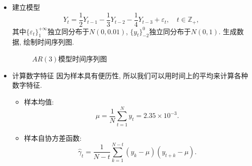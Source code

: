\documentclass[chinese, lineno, watermark]{assignment}
\begin{document}
    \begin{solution}
        \begin{itemize}
            \item{建立模型}
            \begin{equation}
                Y_{t}=\frac{1}{2}Y_{t-1}-\frac{1}{3}Y_{t-2}-\frac{1}{4}Y_{t-3}+\varepsilon_{t},\quad t\in\mathbb{Z}_{+},
            \end{equation}
            其中$\{\varepsilon_{t}\}_{1}^{+\infty}$独立同分布于$N(0, 0.01)$, $\{y_{t}\}_{-2}^{0}$独立同分布于$N(0, 1)$. 生成数据, 绘制时间序列图.
            \begin{figure}[H]
                \centering
                \caption{$AR(3)$模型时间序列图}
            \end{figure}
            \item{计算数字特征}
            因为样本具有便历性, 所以我们可以用时间上的平均来计算各种数字特征.
            \begin{itemize}
                \item 样本均值:
                \begin{equation}
                    \mu = \frac{1}{N}{\sum_{t=1}^{N}{y_{t}}} = 2.35\times10^{-3}.
                \end{equation}
                \item 样本自协方差函数:
                \begin{equation}
                    \hat{\gamma}_{t} = \frac{1}{N-t}\sum_{k=1}^{N-t}(y_{k}-\mu)(y_{t+k}-\mu).
                \end{equation}
                \begin{figure}[H]
                    \centering
\end{figure}
\end{itemize}
\end{itemize}
\end{solution}
\end{document}
